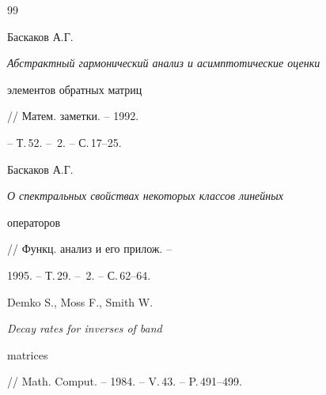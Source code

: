 \begin{thebibliography}{99} 


 




Баскаков А.Г. {\em Абстрактный гармонический анализ и асимптотические оценки


элементов обратных матриц} // Матем. заметки. -- 1992.


-- Т.\,52. -- \No\,2. -- С.\,17--25.




Баскаков А.Г. {\em О спектральных свойствах некоторых классов линейных


операторов} // Функц. анализ и его прилож. --


1995. -- Т.\,29. -- \No\,2. -- С.\,62--64.




Demko S., Moss F., Smith W. {\em Decay rates for inverses of band


matrices} // Math. Comput. -- 1984. -- V.\,43. -- P.\,491--499.





\end{thebibliography} 


 


\vskip 2cm 


 






\label{end} 


 





